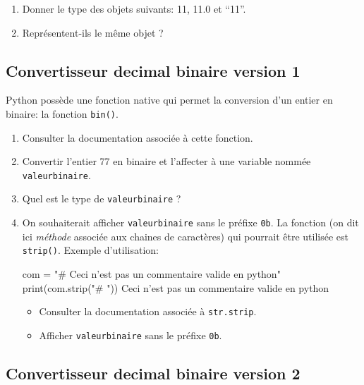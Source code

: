 \documentclass[11pt, french]{article}
\providecommand{\tightlist}{%
      \setlength{\itemsep}{0pt}\setlength{\parskip}{0pt}}
\newenvironment{Shaded}{}{}
\newcommand{\StringTok}[1]{\textcolor[rgb]{0.25,0.44,0.63}{{#1}}}
\newcommand{\NormalTok}[1]{{#1}}
\newcommand{\OperatorTok}[1]{\textcolor[rgb]{0.40,0.40,0.40}{{#1}}}
\newcommand{\BuiltInTok}[1]{{#1}}
\begin{document}
\begin{enumerate}
\item Donner le type des objets suivants: 11, 11.0 et ``11''. 
\item Représentent-ils le même objet ? 
\end{enumerate}

\hypertarget{Convertisseur-dec-binv1}{%
\subsection{Convertisseur decimal binaire version 1}\label{Convertisseur-dec-binv1}}

Python possède une fonction native qui permet la conversion d'un entier
en binaire: la fonction \texttt{bin()}. 
\begin{enumerate}
\item Consulter la documentation associée à cette fonction. 
\item Convertir l'entier 77 en binaire et l'affecter à une variable nommée \texttt{valeurbinaire}. 
\item Quel est le type de \texttt{valeurbinaire} ? 
\item On souhaiterait afficher \texttt{valeurbinaire} sans le préfixe \texttt{0b}. La fonction (on dit
ici \emph{méthode} associée aux chaines de caractères) qui pourrait être
utilisée est \texttt{strip()}. Exemple d'utilisation:

\begin{Shaded}
\begin{Highlighting}[]
\NormalTok{com }\OperatorTok{=} \StringTok{"# Ceci n'est pas un commentaire valide en python"}
\BuiltInTok{print}\NormalTok{(com.strip(}\StringTok{"# "}\NormalTok{))}
\StringTok{Ceci n'est pas un commentaire valide en python}
\end{Highlighting}
\end{Shaded}

\begin{itemize}
\tightlist
\item
  Consulter la documentation associée à \texttt{str.strip}.
\item
  Afficher \texttt{valeurbinaire} sans le préfixe \texttt{0b}.
\end{itemize}
\end{enumerate}
\hypertarget{c.-convertisseur-decimal-binaire-version-2}{%
\subsection{Convertisseur decimal binaire version
2}\label{c.-convertisseur-decimal-binaire-version-2}}
\end{document}
